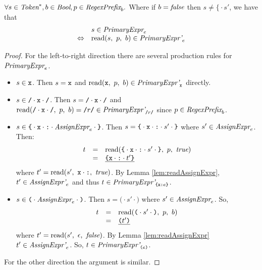 \documentclass[preprint,10pt]{sigplanconf}
\begin{document}
\begin{lemma}\mbox{}
  
  \( \forall s \in \textit{Token}^*, b \in \textit{Bool}, p \in \textit{RegexPrefix}_b. \)
  Where if \( b = \textit{false} \) then \( s \not = \texttt{\{} \cdot s' \),
  we have that
  \[ 
  \begin{array}{rl}
  &s \in \textit{PrimaryExpr}_{e} 
  \\
  \Leftrightarrow &
  \textrm{read}(s,~p,~b) \in \textit{PrimaryExpr'}_{e} 
  \end{array}
  \]
\end{lemma}
\begin{proof}
  For the left-to-right direction there are several production rules for
  \( \textit{PrimaryExpr}_{e} \).
  \begin{itemize}
  \item \( s \in \texttt{x} \). Then \( s
    = \texttt{x} \) and \( \textrm{read}(\texttt{x},~p,~b) \in
    \textit{PrimaryExpr'}_{\texttt{x}} \) directly.

  \item \( s \in \texttt{/} \cdot \texttt{x} \cdot \texttt{/} \). Then \( s
    = \texttt{/} \cdot \texttt{x} \cdot \texttt{/} \) and \( \textrm{read}(\texttt{/} \cdot \texttt{x} \cdot \texttt{/},~p,~b) = \texttt{/}r\texttt{/} \in
    \textit{PrimaryExpr'}_{\texttt{/}r\texttt{/}} \) since \( p \in \textit{RegexPrefix}_b \).

  \item \( s \in 
  \texttt{\{} \cdot
    \texttt{x} \cdot \texttt{:} \cdot \textit{AssignExpr}_{e}
    \cdot \texttt{\}}
    \).
    Then \( s = \texttt{\{} \cdot \texttt{x} \cdot \texttt{:} \cdot 
    s' \cdot \texttt{\}} \) where \(
    s' \in \textit{AssignExpr}_{e} \). Then:
    \[
    \begin{array}{rcl}
      t &=& \textrm{read}(\texttt{\{} \cdot \texttt{x}\cdot  
        \texttt{:} \cdot s' \cdot \texttt{\}},~p,~\textit{true})
      \\
      &=& \underline{ \texttt{\{} \texttt{x} \cdot \texttt{:} \cdot t' \texttt{\}} }
    \end{array}
    \]
    where \( t' = \textrm{read}(s',~\texttt{x} \cdot \texttt{:},~\textit{true}) \). By Lemma
    \ref{lem:readAssignExpr}, \( t' \in
    \textit{AssignExpr'}_{e} \) and thus \( t \in
    \textit{PrimaryExpr'}_{
    \texttt{\{}\texttt{x}\texttt{:}e \texttt{\}}} \).
    
  \item \( s \in \texttt{(} \cdot \textit{AssignExpr}_{e} \cdot \texttt{)} \). 
    Then \( s = \texttt{(} \cdot s' \cdot \texttt{)} \)
    where \( s' \in \textit{AssignExpr}_{e} \). So,
    \[
    \begin{array}{rcl}
      t &=& \textrm{read}(\texttt{(} \cdot s' \cdot \texttt{)},~p,~b)
      \\
      &=& \underline{ \texttt{(} t' \texttt{)}}
    \end{array}
    \]
    where \( t' = \textrm{read}(s',~\epsilon,~\textit{false}) \). By Lemma
    \ref{lem:readAssignExpr} \( t' \in
    \textit{AssignExpr'}_{e} \). So, \( t \in
    \textit{PrimaryExpr'}_{\texttt{(} e \texttt{)}} \).
  \end{itemize}
  
  For the other direction the argument is similar.
\end{proof}
\end{document}
